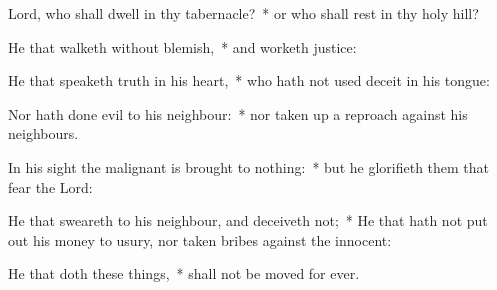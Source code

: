 \begin{enpars}
\item Lord, who shall dwell in thy tabernacle?~* or who shall rest in thy holy hill?
\item He that walketh without blemish,~* and worketh justice:
\item He that speaketh truth in his heart,~* who hath not used deceit in his tongue:
\item Nor hath done evil to his neighbour:~* nor taken up a reproach against his neighbours.
\item In his sight the malignant is brought to nothing:~* but he glorifieth them that fear the Lord:
\item He that sweareth to his neighbour, and deceiveth not;~* He that hath not put out his money to usury, nor taken bribes against the innocent:
\item He that doth these things,~* shall not be moved for ever.
\end{enpars}